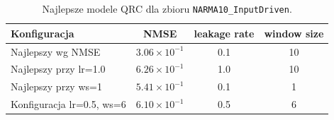 \begin{table}[ht]
\centering
\caption{Najlepsze modele QRC dla zbioru \texttt{NARMA10\_InputDriven}.}
\label{tab:qrc-narma10_inputdriven}
\begin{tabular}{lccc}
\toprule
Konfiguracja & NMSE & leakage rate & window size \\
\midrule
Najlepszy wg NMSE & $3.06 \times 10^{-1}$ & 0.1 & 10 \\
Najlepszy przy lr=1.0 & $6.26 \times 10^{-1}$ & 1.0 & 10 \\
Najlepszy przy ws=1 & $5.41 \times 10^{-1}$ & 0.1 & 1 \\
Konfiguracja lr=0.5, ws=6 & $6.10 \times 10^{-1}$ & 0.5 & 6 \\
\bottomrule
\end{tabular}
\end{table}